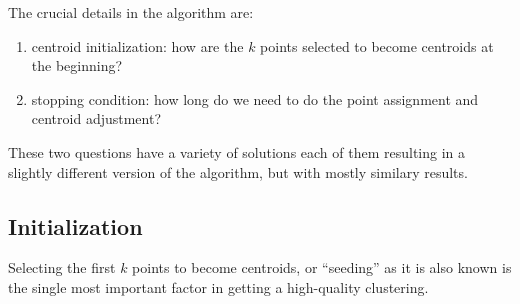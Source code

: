 \documentclass{article}
\begin{document}
The crucial details in the algorithm are:
\begin{enumerate}
    \item centroid initialization: how are the $k$ points selected to become
        centroids at the beginning?
    \item stopping condition: how long do we need to do the point assignment
        and centroid adjustment?
\end{enumerate}
These two questions have a variety of solutions each of them resulting in a
slightly different version of the algorithm, but with mostly similary results.

\subsection{Initialization}
Selecting the first $k$ points to become centroids, or ``seeding'' as it is
also known is the single most important factor in getting a high-quality
clustering.
\end{document}
